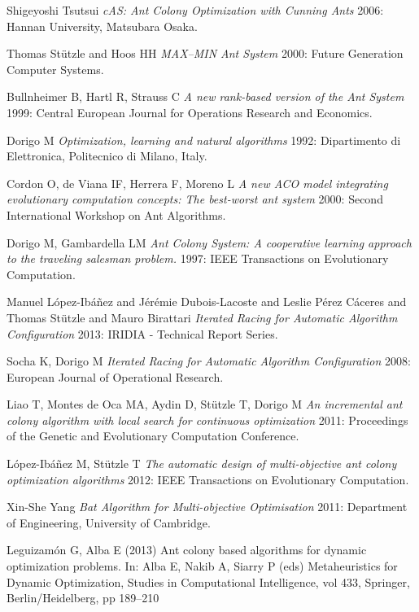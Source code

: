 \documentclass[12pt]{article}
\begin{document}
\begin{thebibliography}{1}
 Shigeyoshi Tsutsui {\em cAS: Ant Colony Optimization with Cunning
Ants} 2006: Hannan University, Matsubara Osaka.

 Thomas St{\"u}tzle and Hoos HH {\em MAX–MIN Ant System} 2000: Future Generation Computer Systems.

 Bullnheimer B, Hartl R, Strauss C {\em A new rank-based version of the
Ant System} 1999: Central European Journal for Operations Research and Economics.

 Dorigo M {\em Optimization, learning and natural algorithms} 1992: Dipartimento di Elettronica, Politecnico di Milano, Italy.

 Cordon O, de Viana IF, Herrera F, Moreno L {\em A new ACO model
integrating evolutionary computation concepts: The best-worst ant system} 2000: Second International Workshop on Ant Algorithms.

 Dorigo M, Gambardella LM {\em Ant Colony System: A cooperative learning approach to the traveling salesman problem.} 1997: IEEE Transactions on Evolutionary
Computation.

 Manuel L{\'o}pez-Ib{\'a}{\~n}ez  and  J{\'e}r{\'e}mie Dubois-Lacoste  and Leslie {P{\'e}rez C{\'a}ceres}  and  Thomas St{\"u}tzle  and  Mauro Birattari {\em Iterated Racing for Automatic Algorithm Configuration} 2013: IRIDIA - Technical Report Series.

 Socha K, Dorigo M {\em Iterated Racing for Automatic Algorithm Configuration} 2008: European Journal of Operational Research.
  
 Liao T, Montes de Oca MA, Aydin D, St{\"u}tzle T, Dorigo M {\em An incremental ant colony algorithm with local search for continuous optimization} 2011: Proceedings of the Genetic and Evolutionary
Computation Conference.  
  
 L{\'o}pez-Ib{\'a}{\~n}ez M, St{\"u}tzle T {\em The automatic design of multi-objective ant colony optimization algorithms} 2012: IEEE Transactions on Evolutionary Computation.    
  
 Xin-She Yang {\em Bat Algorithm for Multi-objective Optimisation} 2011: Department of Engineering, University of Cambridge.  

 Leguizam{\'o}n G, Alba E (2013) Ant colony based algorithms for dynamic optimization problems. In: Alba E, Nakib A, Siarry P (eds) Metaheuristics for Dynamic Optimization, Studies in Computational Intelligence, vol 433, Springer, Berlin/Heidelberg, pp 189–210
 

\end{thebibliography}
\end{document}
